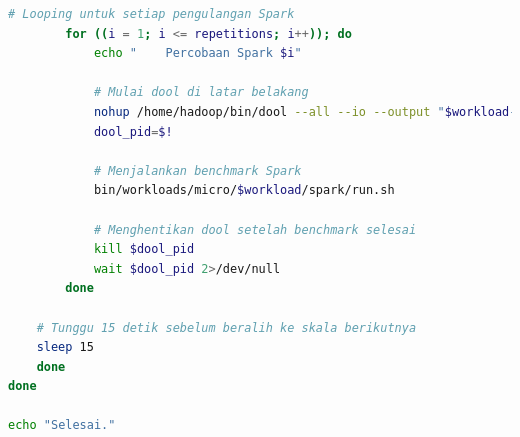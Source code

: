 \begin{lstlisting}[language=bash]
        # Looping untuk setiap pengulangan Spark
        for ((i = 1; i <= repetitions; i++)); do
            echo "    Percobaan Spark $i"

            # Mulai dool di latar belakang
            nohup /home/hadoop/bin/dool --all --io --output "$workload-$scale-$i-spark.csv" --bytes > /dev/null 2>&1 &
            dool_pid=$!

            # Menjalankan benchmark Spark
            bin/workloads/micro/$workload/spark/run.sh

            # Menghentikan dool setelah benchmark selesai
            kill $dool_pid
            wait $dool_pid 2>/dev/null
        done

	# Tunggu 15 detik sebelum beralih ke skala berikutnya
	sleep 15
    done
done

echo "Selesai."
\end{lstlisting}



